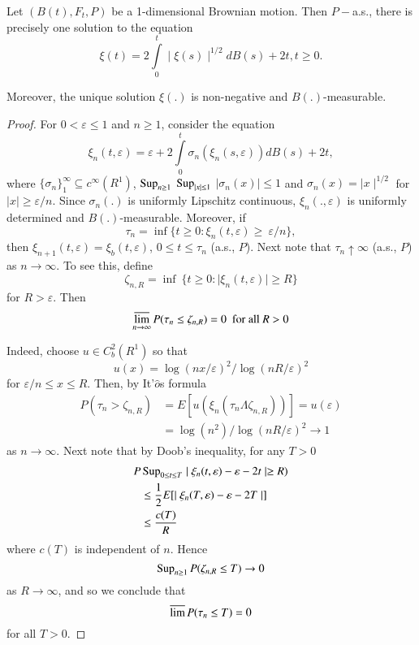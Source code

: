 \setcounter{lemma}{11}
 \begin{lemma}\label{chap2:lem4.12} %
 Let  $ ( B (t), F_t,P ) $  be a  1-dimensional Brownian
 motion. Then  $P-$a.s., there is precisely one solution to the
 equation 
 $$
 \xi (t) = 2 \int \limits^{t}_{0} \mid \xi (s) \mid^{1/2} dB (s) + 2t,
 t \ge 0. 
 $$
 
 Moreover, the unique solution  $ \xi (.) $  is non-negative and $ B
 (.)$-measu\-rable. 
 \end{lemma}  

 
 \begin{proof}
For  $ 0 <  \varepsilon \leq 1 $ and $ n \ge 1 $, consider the
equation  
$$
\xi_n (t, \varepsilon )= \varepsilon  + 2 \int \limits^{t}_{0}
\sigma_n ( \xi_n (s, \varepsilon)) dB (s)  + 2t, 
$$
where $ \{ \sigma_n \}^\infty_1 \subseteq  c^\infty ( R^1 ) $, $ \operatorname{Sup}_{n \ge
  1} $ $ \operatorname{Sup}_{\mid x \mid \leq 1}$ $ \mid \sigma_n (x) \mid \leq 1 $
and  $ \sigma_n (x) = \mid x \mid^{1/2} $ for $ \mid x \mid \ge
\varepsilon / n $. Since $\sigma_n (.) $  is uniformly Lipschitz
continuous, $ \xi_n (., \varepsilon ) $ is  uniformly determined and $
B (.) $-measurable. Moreover, if  
$$
\tau_n = \inf \{ t \ge 0 : \xi_n (t, \varepsilon ) \ge  ~ \varepsilon  
/ n \}, 
$$
then $ \xi_{ n+1 } (t, \varepsilon ) = \xi_b (t, \varepsilon )$, $ 0
\leq t \leq \tau_n $ (a.s., $P$). Next note that $ \tau_n \uparrow
\infty$ (a.s., $P$) as $ n \rightarrow \infty $. To see this, define   
$$
\zeta_{n,R} = \inf~ \{ t \ge 0 : \mid \xi_n ( t, \varepsilon ) \mid
\ge  R \} 
$$
for  $ R > \varepsilon $. Then
$$
 \varlimsup_{n \rightarrow \infty} P ( \tau_n \leq \zeta_{n,R} ) = 0 ~
 \text{ for all }  R > 0 
$$\pageoriginale
 
 Indeed, choose  $ u \in C^2_b ( R^1 ) $ so  that
 $$
 u (x) = \log ( nx/ \varepsilon )^2 / \log  ( nR / \varepsilon )^2 
 $$
for $ \varepsilon / n \leq x \leq R $. Then, by  It'$\hat{o}$s formula 
\begin{align*}
P ( \tau_n > \zeta_{n,R}  )  &=  E [ u (\xi_n ( \tau_n \Lambda
  \zeta_{n,R} )) ] =  u(\varepsilon) \\ 
&= \log (n^2) / \log  (nR / \varepsilon )^2 \rightarrow 1 
\end{align*}
as $ n \rightarrow \infty $. Next note that by Doob's inequality, for
any $ T > 0 $  
\begin{align*}
P &\operatorname{Sup}_{0 \leq t \leq T} \mid  \xi_n (t,\varepsilon ) - \varepsilon-
2t \mid \ge  R ) \\ 
&\leq \frac{1}{2} E [ \mid \xi_n ( T,\varepsilon ) - \varepsilon - 2T
  \mid ] \\ 
&\leq \frac{c (T)}{R} \\ 
\end{align*}
where $ c (T) $ is independent of $n$. Hence  
$$
\operatorname{Sup}_{n \ge 1}  P ( \zeta_{n,R} \leq T ) \rightarrow 0  
$$
as $ R \rightarrow \infty $, and so we conclude that  
$$
\varlimsup P ( \tau_n \leq T ) = 0  
$$
for all $ T > 0 $.


\end{proof}
